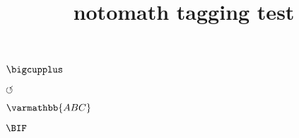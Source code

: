 \documentclass{article}
\title{notomath tagging test}
\begin{document}
\kant[1-2]

\checkmark

\circledR

\maltese

\textsquare

$\bigcupplus$

$\circlearrowleft$

$\varmathbb{ABC}$

$\BIF$
\end{document}
